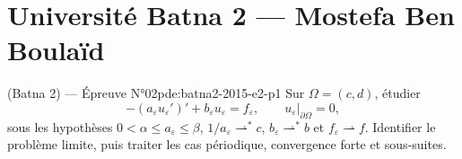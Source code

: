 \section{Université Batna 2 --- Mostefa Ben Boulaïd}
\begin{problem}{(Batna 2) — Épreuve N°02}{pde:batna2-2015-e2-p1}
Sur $\Omega=(c,d)$, étudier
$$-(a_\varepsilon u_\varepsilon')'+b_\varepsilon u_\varepsilon=f_\varepsilon,\qquad u_\varepsilon|_{\partial\Omega}=0,$$
sous les hypothèses $0<\alpha\le a_\varepsilon\le\beta$, $1/a_\varepsilon\rightharpoonup^*c$, $b_\varepsilon\rightharpoonup^*b$ et $f_\varepsilon\rightharpoonup f$. Identifier le problème limite, puis traiter les cas périodique, convergence forte et sous-suites.
\end{problem}
\newpage

